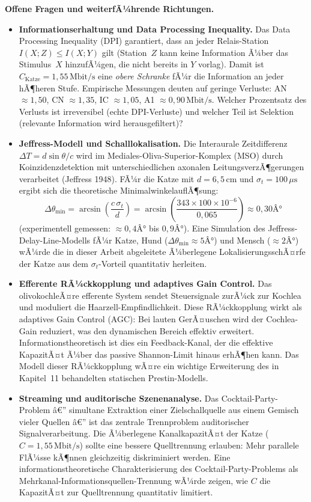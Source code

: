 ﻿\documentclass[12pt,a4paper,titlepage]{report}
\begin{document}
\textbf{Offene Fragen und weiterfÃ¼hrende Richtungen.}
\begin{itemize}[leftmargin=2em]
  \item \textbf{Informationserhaltung und Data Processing Inequality.}
    Das Data Processing Inequality (DPI) garantiert,
    dass an jeder Relais-Station
    $I(X;Z) \leq I(X;Y)$ gilt (Station~$Z$ kann keine Information
    Ã¼ber das Stimulus~$X$ hinzufÃ¼gen, die nicht bereits in $Y$ vorlag).
    Damit ist $C_\mathrm{Katze}=1{,}55\,\mathrm{Mbit/s}$ eine
    \emph{obere Schranke} fÃ¼r die Information an jeder hÃ¶heren Stufe.
    Empirische Messungen deuten auf geringe Verluste:
    AN $\approx 1{,}50$, CN $\approx 1{,}35$, IC $\approx 1{,}05$,
    A1 $\approx 0{,}90\,\mathrm{Mbit/s}$.
    Welcher Prozentsatz des Verlusts ist irreversibel
    (echte DPI-Verluste) und welcher Teil ist Selektion
    (relevante Information wird herausgefiltert)?
  \item \textbf{Jeffress-Modell und Schalllokalisation.}
    Die Interaurale Zeitdifferenz $\Delta T = d\sin\theta/c$
    wird im Mediales-Oliva-Superior-Komplex (MSO) durch
    Koinzidenzdetektion mit unterschiedlichen axonalen LeitungsverzÃ¶gerungen
    verarbeitet (Jeffress 1948).
    FÃ¼r die Katze mit $d=6{,}5\,\mathrm{cm}$ und $\sigma_t=100\,\mu\mathrm{s}$
    ergibt sich die theoretische MinimalwinkelauflÃ¶sung:
    \[
      \Delta\theta_{\min} = \arcsin\!\left(\frac{c\,\sigma_t}{d}\right)
      = \arcsin\!\left(\frac{343 \times 100\times10^{-6}}{0{,}065}\right)
      \approx 0{,}30Â°
    \]
    (experimentell gemessen: $\approx0{,}4Â°$ bis $0{,}9Â°$).
    Eine Simulation des Jeffress-Delay-Line-Modells fÃ¼r Katze,
    Hund ($\Delta\theta_{\min}\approx5Â°$) und Mensch ($\approx2Â°$)
    wÃ¼rde die in dieser Arbeit abgeleitete Ã¼berlegene
    LokalisierungsschÃ¤rfe der Katze aus dem $\sigma_t$-Vorteil
    quantitativ herleiten.
  \item \textbf{Efferente RÃ¼ckkopplung und adaptives Gain Control.}
    Das olivokochleÃ¤re efferente System sendet Steuersignale
    zurÃ¼ck zur Kochlea und moduliert die Haarzell-Empfindlichkeit.
    Diese RÃ¼ckkopplung wirkt als adaptives Gain Control (AGC):
    Bei lauten GerÃ¤uschen wird der Cochlea-Gain reduziert,
    was den dynamischen Bereich effektiv erweitert.
    Informationstheoretisch ist dies ein Feedback-Kanal,
    der die effektive KapazitÃ¤t Ã¼ber das passive Shannon-Limit
    hinaus erhÃ¶hen kann.
    Das Modell dieser RÃ¼ckkopplung wÃ¤re ein wichtige Erweiterung
    des in Kapitel~11 behandelten statischen Prestin-Modells.
  \item \textbf{Streaming und auditorische Szenenanalyse.}
    Das Cocktail-Party-Problem â€” simultane Extraktion einer
    Zielschallquelle aus einem Gemisch vieler Quellen â€”
    ist das zentrale Trennproblem auditorischer Signalverarbeitung.
    Die Ã¼berlegene KanalkapazitÃ¤t der Katze ($C = 1{,}55\,\mathrm{Mbit/s}$)
    sollte eine bessere Quelltrennung erlauben:
    Mehr parallele FlÃ¼sse kÃ¶nnen gleichzeitig diskriminiert werden.
    Eine informationstheoretische Charakterisierung
    des Cocktail-Party-Problems als Mehrkanal-Informationsquellen-Trennung
    wÃ¼rde zeigen, wie $C$ die KapazitÃ¤t zur Quelltrennung
    quantitativ limitiert.
\end{itemize}
\end{document}
